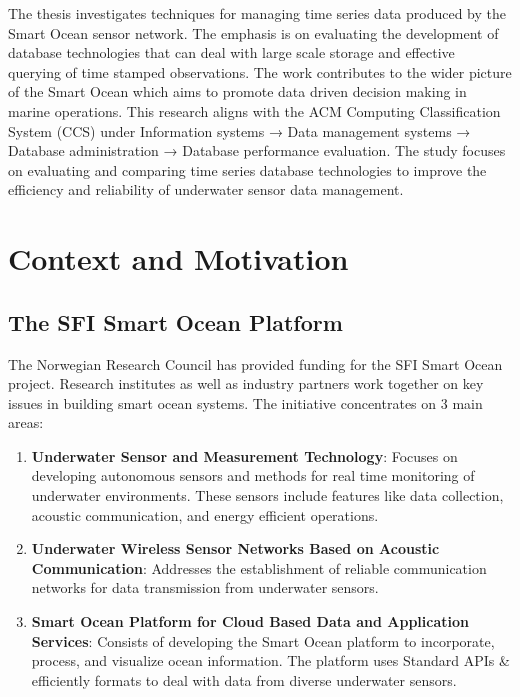 The thesis investigates techniques for managing time series data produced by
the Smart Ocean sensor network. The emphasis is on evaluating the development
of database technologies that can deal with large scale storage and effective
querying of time stamped observations. The work contributes to the wider
picture of the Smart Ocean which aims to promote data driven decision making in
marine operations. This research aligns with the ACM Computing Classification
System (CCS) under Information systems → Data management systems → Database
administration → Database performance evaluation\cite{ACM-CCS-2012}. The study
focuses on evaluating and comparing time series database technologies to
improve the efficiency and reliability of underwater sensor data management.

\section{Context and Motivation}
\subsection{The SFI Smart Ocean Platform}
The Norwegian Research Council has provided funding for the SFI Smart Ocean
project. Research institutes as well as industry partners work together on key
issues in building smart ocean systems\cite{SmartOceanHub}. The initiative
concentrates on 3 main areas:

\begin{enumerate} \item \textbf{Underwater Sensor and Measurement Technology}:
            Focuses on developing autonomous sensors and methods for real time
            monitoring
            of underwater environments. These sensors include features like
            data
            collection, acoustic communication, and energy efficient
            operations.

      \item \textbf{Underwater Wireless Sensor Networks Based on Acoustic
                  Communication}: Addresses the establishment of reliable
            communication networks
            for data transmission from underwater sensors.

      \item \textbf{Smart Ocean Platform for Cloud Based Data and Application
                  Services}: Consists of developing the Smart Ocean platform to
            incorporate,
            process, and visualize ocean information. The platform uses
            Standard APIs \&
            efficiently formats to deal with data from diverse underwater
            sensors.
\end{enumerate}

